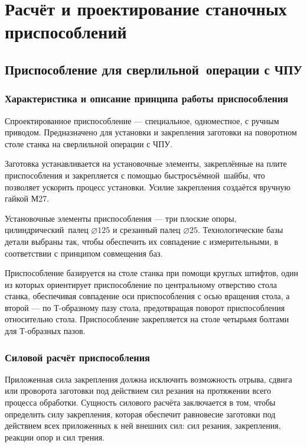 \documentclass[14pt,russian,a4paper]{extreport}
\begin{document}
\chapter{Расчёт и проектирование станочных приспособлений}

\section{Приспособление для сверлильной операции с ЧПУ}

\subsection{Характеристика и описание принципа работы приспособления}

Спроектированное приспособление --- специальное, одноместное, с ручным приводом. Предназначено для установки и закрепления заготовки на поворотном столе станка на сверлильной операции с ЧПУ.

Заготовка устанавливается на установочные элементы, закреплённые на плите приспособления и закрепляется с помощью быстросъёмной шайбы, что позволяет ускорить процесс установки. Усилие закрепления создаётся вручную гайкой М27.

Установочные элементы приспособления --- три плоские опоры, цилиндрический палец $\diameter 125$ и срезанный палец $\diameter 25$. Технологические базы детали выбраны так, чтобы обеспечить их совпадение с измерительными, в соответствии с принципом совмещения баз.

Приспособление базируется на столе станка при помощи круглых штифтов, один из которых ориентирует приспособление по центральному отверстию стола станка, обеспечивая совпадение оси приспособления с осью вращения стола, а второй --- по Т-образному пазу стола, предотвращая поворот приспособления относительно стола. Приспособление закрепляется на столе четырьмя болтами для Т-образных пазов.

\subsection{Силовой расчёт приспособления}

Приложенная сила закрепления должна исключить возможность отрыва, сдвига или проворота заготовки под действием сил резания на протяжении всего процесса обработки. Сущность силового расчёта заключается в том, чтобы определить силу закрепления, которая обеспечит равновесие заготовки под действием всех приложенных к ней внешних сил: сил резания, закрепления, реакции опор и сил трения.
\end{document}
